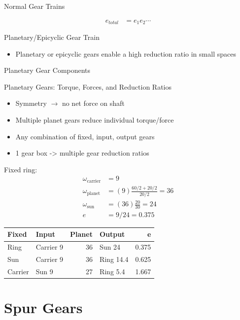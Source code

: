 \documentclass[a4paper,openany]{tufte-book}
\begin{document}
Normal Gear Trains

\begin{align}
    e_{total} &= e_{1}e_{2}\cdots
  \end{align}

Planetary/Epicyclic Gear Train

\begin{itemize}
\item Planetary or epicyclic gears enable a high reduction ratio in small
spaces
\end{itemize}

Planetary Gear Components

Planetary Gears: Torque, Forces, and Reduction Ratios

\begin{itemize}
\item Symmetry \(\rightarrow\) no net force on shaft

\item Multiple planet gears reduce individual torque/force

\item Any combination of fixed, input, output gears

\item 1 gear box -> multiple gear reduction ratios
\end{itemize}

Fixed ring:\\

\begin{align*}
  \omega_{\text{carrier}} &= 9 \\
  \omega_{\text{planet}} &= (9) \frac{60/2 + 20/2}{20/2} = 36 \\
  \omega_{\text{sun}} &= (36) \frac{20}{30} = 24 \\
  e &= 9/24 = 0.375
\end{align*}

\begin{center}
\begin{tabular}{llrlr}
\toprule
Fixed & Input & Planet & Output & e\\
\midrule
Ring & Carrier 9 & 36 & Sun 24 & 0.375\\
Sun & Carrier 9 & 36 & Ring 14.4 & 0.625\\
Carrier & Sun 9 & 27 & Ring 5.4 & 1.667\\
\bottomrule
\end{tabular}
\end{center}

\chapter{Spur Gears}
\label{sec:org7e05ff9}
\end{document}

